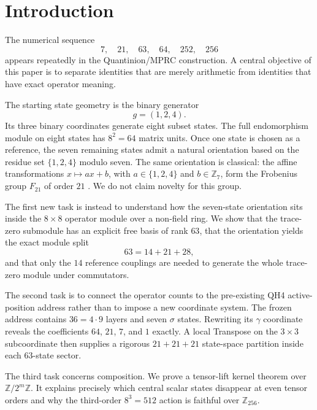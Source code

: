 \documentclass[11pt]{article}
\theoremstyle{definition}
\newcommand{\Z}{\mathbb Z}
\begin{document}
\section{Introduction}
The numerical sequence
\[
7,\quad21,\quad63,\quad64,\quad252,\quad256
\]
appears repeatedly in the Quantinion/MPRC construction. A central objective of this paper is to separate identities that are merely arithmetic from identities that have exact operator meaning.

The starting state geometry is the binary generator
\[
g=(1,2,4).
\]
Its three binary coordinates generate eight subset states. The full endomorphism module on eight states has $8^2=64$ matrix units. Once one state is chosen as a reference, the seven remaining states admit a natural orientation based on the residue set $\{1,2,4\}$ modulo seven. The same orientation is classical: the affine transformations $x\mapsto ax+b$, with $a\in\{1,2,4\}$ and $b\in\Z_7$, form the Frobenius group $F_{21}$ of order $21$ \cite{CostaPavone2024}. We do not claim novelty for this group.

The first new task is instead to understand how the seven-state orientation sits inside the $8\times8$ operator module over a non-field ring. We show that the trace-zero submodule has an explicit free basis of rank $63$, that the orientation yields the exact module split
\[
63=14+21+28,
\]
and that only the $14$ reference couplings are needed to generate the whole trace-zero module under commutators.

The second task is to connect the operator counts to the pre-existing QH4 active-position address rather than to impose a new coordinate system. The frozen address contains $36=4\cdot9$ layers and seven $\sigma$ states. Rewriting its $\gamma$ coordinate reveals the coefficients $64$, $21$, $7$, and $1$ exactly. A local Transpose on the $3\times3$ subcoordinate then supplies a rigorous $21+21+21$ state-space partition inside each $63$-state sector.

The third task concerns composition. We prove a tensor-lift kernel theorem over $\Z/2^m\Z$. It explains precisely which central scalar states disappear at even tensor orders and why the third-order $8^3=512$ action is faithful over $\Z_{256}$.
\end{document}
